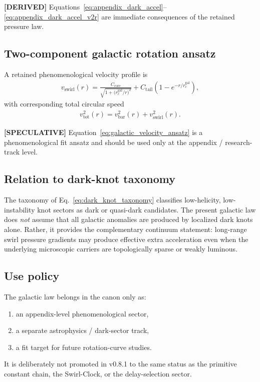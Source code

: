 \documentclass[11pt]{article}
\theoremstyle{definition}
\theoremstyle{plain}
\theoremstyle{remark}
\begin{document}
        \textbf{[DERIVED]} Equations~\eqref{eq:appendix_dark_accel}--\eqref{eq:appendix_dark_accel_v2r} are immediate consequences of the retained pressure law.
    
    \subsection{Two-component galactic rotation ansatz}
        A retained phenomenological velocity profile is
        \begin{align}
            v_{\mathrm{swirl}}(r)
            =
            \frac{C_{\mathrm{core}}}{\sqrt{1+\bigl(r_c^{\mathrm{gal}}/r\bigr)^2}}
            +
            C_{\mathrm{tail}}
            \left(1-e^{-r/r_c^{\mathrm{gal}}}\right),
            \label{eq:galactic_velocity_ansatz}
        \end{align}
        with corresponding total circular speed
        \begin{align}
            v_{\mathrm{tot}}^2(r)
            =
            v_{\mathrm{bar}}^2(r)
            +
            v_{\mathrm{swirl}}^2(r).
            \label{eq:total_circular_speed_appendix}
        \end{align}
        
        \textbf{[SPECULATIVE]} Equation~\eqref{eq:galactic_velocity_ansatz} is a phenomenological fit ansatz and should be used only at the appendix / research-track level.
    
    \subsection{Relation to dark-knot taxonomy}
        The taxonomy of Eq.~\eqref{eq:dark_knot_taxonomy} classifies low-helicity, low-instability knot sectors as dark or quasi-dark candidates. The present galactic law does \emph{not} assume that all galactic anomalies are produced by localized dark knots alone. Rather, it provides the complementary continuum statement: long-range swirl pressure gradients may produce effective extra acceleration even when the underlying microscopic carriers are topologically sparse or weakly luminous.
    
    \subsection{Use policy}
        The galactic law belongs in the canon only as:
        \begin{enumerate}
            \item an appendix-level phenomenological sector,
            \item a separate astrophysics / dark-sector track,
            \item a fit target for future rotation-curve studies.
        \end{enumerate}
        It is deliberately not promoted in v0.8.1 to the same status as the primitive constant chain, the Swirl-Clock, or the delay-selection sector.
        
\end{document}
